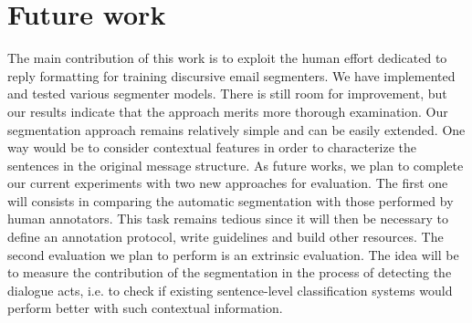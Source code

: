 

\section{Future work}
\label{sec:futureWork}

The main contribution of this work is to exploit the human effort dedicated to reply formatting for training discursive email segmenters. 
We have implemented and tested various segmenter models. 
There is still room for improvement, but our results indicate that the approach merits more thorough examination.
%
Our segmentation approach remains relatively simple and can be easily extended. One way would be to consider contextual features in order to characterize the sentences in the original message structure.
%
As future works, we plan to complete our current experiments with two new approaches for evaluation. The first one will consists in comparing the automatic segmentation with those performed by human annotators.
This task remains tedious since it will then be necessary to define an annotation protocol, write guidelines and build other resources.
The second evaluation we plan to perform is an extrinsic evaluation. The idea will be to measure the contribution of the segmentation in the process of detecting the dialogue acts, i.e. to check if existing sentence-level classification systems would perform better with such contextual information. %

